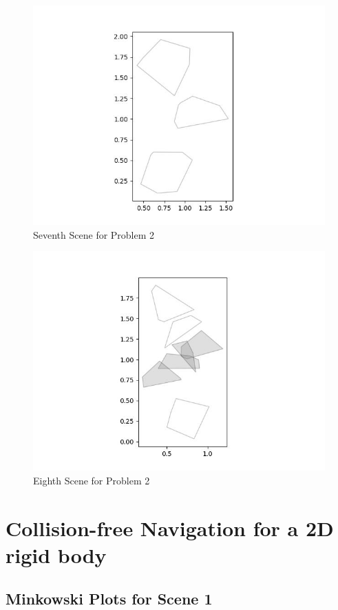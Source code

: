 \documentclass{article}
\begin{document}
\begin{figure}[h!]
	\includegraphics[width= 0.9 \linewidth]{Problem2_scene7.jpg}
	\centering
	\caption{Seventh Scene for Problem 2}
	\label{Problem2_scene7.jpg}
\end{figure}

\begin{figure}[h!]
	\includegraphics[width= 0.9 \linewidth]{Problem2_scene8.jpg}
	\centering
	\caption{Eighth Scene for Problem 2}
	\label{Problem2_scene8.jpg}
\end{figure}


 \newpage 
\section{Collision-free Navigation for a 2D rigid body}
\newpage
\subsection{Minkowski Plots for Scene 1}
\end{document}

